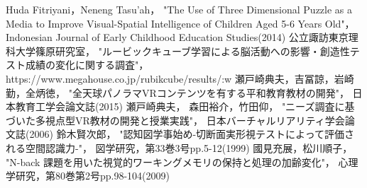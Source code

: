 \newpage
\begin{thebibliography}{9}
    Huda Fitriyani，Neneng Tasu’ah，
    "The Use of Three Dimensional Puzzle as a Media to Improve Visual-Spatial Intelligence of Children Aged 5-6 Years Old"，
    Indonesian Journal of Early Childhood Education Studies(2014)
    公立諏訪東京理科大学篠原研究室，
    "ルービックキューブ学習による脳活動への影響・創造性テスト成績の変化に関する調査"，
    https://www.megahouse.co.jp/rubikcube/results/:w
    瀬戸崎典夫，吉冨諒，岩崎勤，全炳徳，
    "全天球パノラマVRコンテンツを有する平和教育教材の開発"，
    日本教育工学会論文誌(2015)
    瀬戸崎典夫， 森田裕介，竹田仰，
    "ニーズ調査に基づいた多視点型VR教材の開発と授業実践"，
    日本バーチャルリアリティ学会論文誌(2006)
    鈴木賢次郎，
    "認知図学事始め-切断面実形視テストによって評価される空間認識力-"，
    図学研究，第33巻3号pp.5-12(1999)
    國見充展，松川順子，
    "N-back 課題を用いた視覚的ワーキングメモリの保持と処理の加齢変化"，
    心理学研究，第80巻第2号pp.98-104(2009)
\end{thebibliography}
